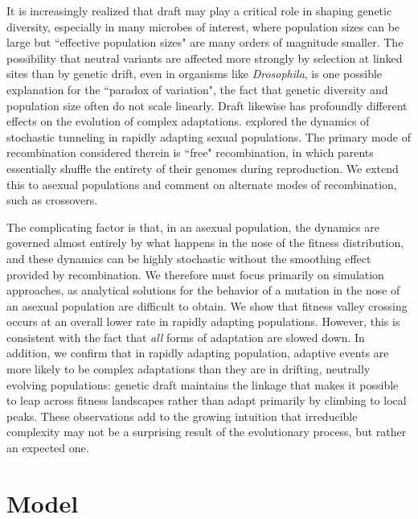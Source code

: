 \documentclass[rmp]{revtex4}
\begin{document}
It is increasingly realized that draft may play a critical role in shaping genetic diversity, especially in many microbes of interest, where population sizes can be large but ``effective population sizes" are many orders of magnitude smaller.
The possibility that neutral variants are affected more strongly by selection at linked sites than by genetic drift, even in organisms like \emph{Drosophila}, is one possible explanation for the ``paradox of variation", the fact that genetic diversity and population size often do not scale linearly.
Draft likewise has profoundly different effects on the evolution of complex adaptations.
\citet{neher_shraiman_2011} explored the dynamics of stochastic tunneling in rapidly adapting sexual populations.
The primary mode of recombination considered therein is ``free" recombination, in which parents essentially shuffle the entirety of their genomes during reproduction.
We extend this to asexual populations and comment on alternate modes of recombination, such as crossovers.

The complicating factor is that, in an asexual population, the dynamics are governed almost entirely by what happens in the nose of the fitness distribution, and these dynamics can be highly stochastic without the smoothing effect provided by recombination.
We therefore must focus primarily on simulation approaches, as analytical solutions for the behavior of a mutation in the nose of an asexual population are difficult to obtain.
We show that fitness valley crossing occurs at an overall lower rate in rapidly adapting populations.
However, this is consistent with the fact that \emph{all} forms of adaptation are slowed down.
In addition, we confirm that in rapidly adapting population, adaptive events are more likely to be complex adaptations than they are in drifting, neutrally evolving populations: genetic draft maintains the linkage that makes it possible to leap across fitness landscapes rather than adapt primarily by climbing to local peaks.
These observations add to the growing intuition that irreducible complexity may not be a surprising result of the evolutionary process, but rather an expected one.

\section*{Model}
\end{document}
